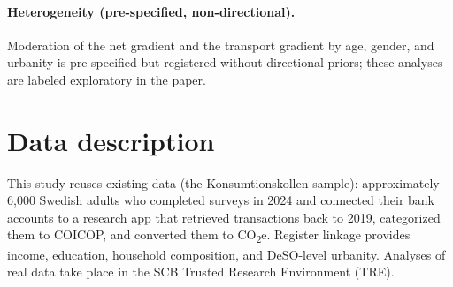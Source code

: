 \documentclass[11pt,a4paper]{article}
\begin{document}
\paragraph{Heterogeneity (pre-specified, non-directional).} Moderation of the
net gradient and the transport gradient by age, gender, and urbanity is
pre-specified but registered without directional priors; these analyses are
labeled exploratory in the paper.

\section{Data description}

This study reuses existing data (the Konsumtionskollen sample): approximately
6{,}000 Swedish adults who completed surveys in 2024 and connected their bank
accounts to a research app that retrieved transactions back to 2019, categorized
them to COICOP, and converted them to CO\textsubscript{2}e. Register linkage
provides income, education, household composition, and DeSO-level urbanity.
Analyses of real data take place in the SCB Trusted Research Environment (TRE).
\end{document}
